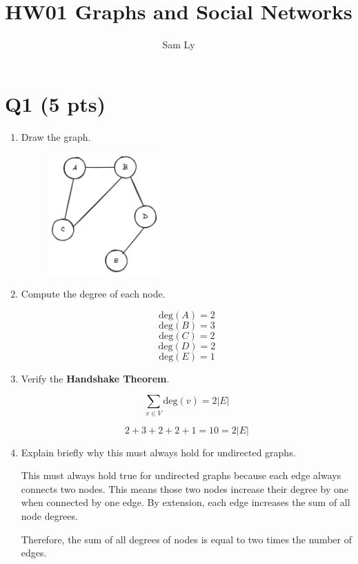 \documentclass{article}
\title{HW01 Graphs and Social Networks}
\author{Sam Ly}
\begin{document}
\maketitle

\section*{Q1 (5 pts)}

\begin{enumerate}
    \item {
        Draw the graph.
        \begin{figure}[htbp]
            \centering
            \includegraphics[width=0.4\textwidth]{graph.png}
        \end{figure}
    }

    \item {
        Compute the degree of each node.

        \[ \text{deg}(A) = 2 \]
        \[ \text{deg}(B) = 3 \]
        \[ \text{deg}(C) = 2 \]
        \[ \text{deg}(D) = 2 \]
        \[ \text{deg}(E) = 1 \]
    }

    \item {
        Verify the \textbf{Handshake Theorem}.

        \[\sum_{v \in V}{\text{deg}(v)} = 2 |E| \]

        \[2+3+2+2+1 = 10 = 2 |E| \]
    }

    \item {
        Explain briefly why this must always hold for undirected graphs.

        This must always hold true for undirected graphs because each edge
        always connects two nodes. This means those two nodes increase their
        degree by one when connected by one edge. By extension, each edge 
        increases the sum of all node degrees. 

        Therefore, the sum of all degrees of nodes is equal to two times the 
        number of edges.
    }
\end{enumerate}
\end{document}

